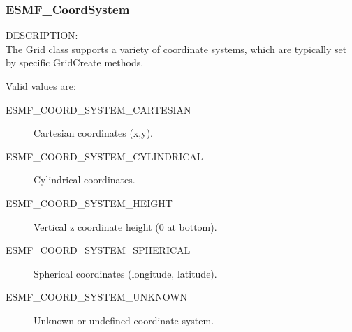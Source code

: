  \subsubsection{ESMF\_CoordSystem}

 {\sf DESCRIPTION:\\}
 The Grid class supports a variety of coordinate systems, which are typically
 set by specific GridCreate methods.

 Valid values are:
 \begin{description}
    \item [ESMF\_COORD\_SYSTEM\_CARTESIAN]
          Cartesian coordinates (x,y).

    \item [ESMF\_COORD\_SYSTEM\_CYLINDRICAL] 
          Cylindrical coordinates.

    \item [ESMF\_COORD\_SYSTEM\_HEIGHT]
          Vertical z coordinate height (0 at bottom).

    \item [ESMF\_COORD\_SYSTEM\_SPHERICAL]
          Spherical coordinates (longitude, latitude).

    \item [ESMF\_COORD\_SYSTEM\_UNKNOWN]
          Unknown or undefined coordinate system.

 \end{description}


